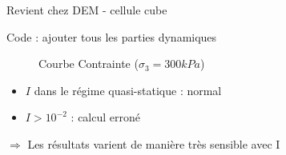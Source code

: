 \documentclass[10pt]{beamer}
\begin{document}




\begin{frame}{Revient chez DEM - cellule cube}
    \begin{center}
    \end{center}
\end{frame}

\begin{frame}{Code : ajouter tous les parties dynamiques}
    \begin{figure}[h]
        \centering
        \scalebox{0.5}{}
        \caption{Courbe Contrainte ($\sigma_3 = 300kPa$)}
    \end{figure}
    \begin{itemize}
        \item $I$ dans le régime quasi-statique : normal
        \item $I > 10^{-2}$ : calcul erroné
    \end{itemize}
    $\Rightarrow$ Les résultats varient de manière très sensible avec I
\end{frame}
\end{document}
